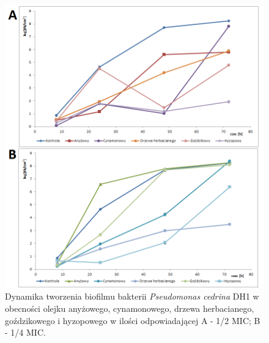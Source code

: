 \documentclass[11pt,a4paper]{report}
\begin{document}
\begin{figure}[!h]
\begin{center}
\includegraphics[scale=0.68]{img/dh2-a.png}
\caption{Dynamika tworzenia biofilmu bakterii \textit{Pseudomonas cedrina} DH1 w obecności olejku anyżowego, cynamonowego, drzewa herbacianego, goździkowego i hyzopowego w ilości odpowiadającej A - 1/2 MIC; B - 1/4 MIC.}\label{dh2-a}
\end{center} 
\end{figure}
\end{document}
